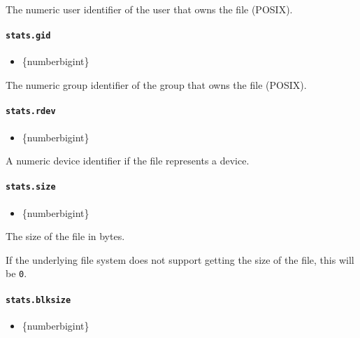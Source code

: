 The numeric user identifier of the user that owns the file (POSIX).

\paragraph{\texorpdfstring{\texttt{stats.gid}}{stats.gid}}\label{stats.gid}

\begin{itemize}
\tightlist
\item
  \{number\textbar bigint\}
\end{itemize}

The numeric group identifier of the group that owns the file (POSIX).

\paragraph{\texorpdfstring{\texttt{stats.rdev}}{stats.rdev}}\label{stats.rdev}

\begin{itemize}
\tightlist
\item
  \{number\textbar bigint\}
\end{itemize}

A numeric device identifier if the file represents a device.

\paragraph{\texorpdfstring{\texttt{stats.size}}{stats.size}}\label{stats.size}

\begin{itemize}
\tightlist
\item
  \{number\textbar bigint\}
\end{itemize}

The size of the file in bytes.

If the underlying file system does not support getting the size of the
file, this will be \texttt{0}.

\paragraph{\texorpdfstring{\texttt{stats.blksize}}{stats.blksize}}\label{stats.blksize}

\begin{itemize}
\tightlist
\item
  \{number\textbar bigint\}
\end{itemize}

